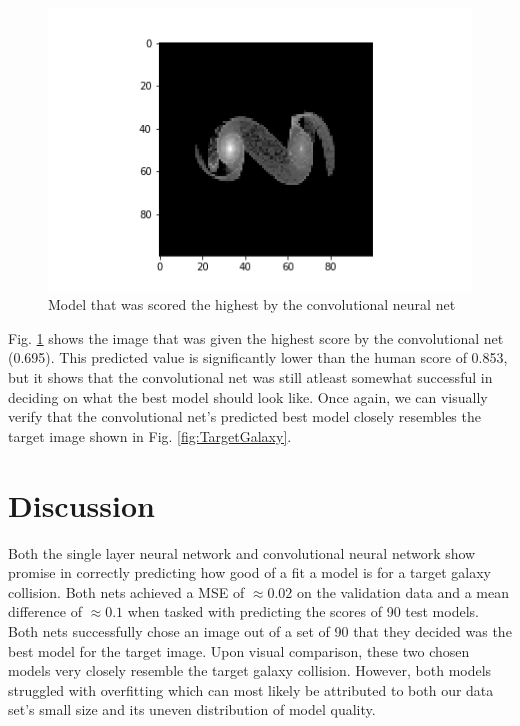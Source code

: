 \documentclass[conference]{IEEEtran}
\begin{document}
\begin{figure}[htbp]
\centerline{\includegraphics[width=0.75\linewidth]{./Images/ConvPredictedBest.png}}
\caption{Model that was scored the highest by the convolutional neural net}
\label{fig:ConvPredictedBest}
\end{figure}

Fig. \ref{fig:ConvPredictedBest} shows the image that was given the highest score by the convolutional net (0.695). This predicted value is significantly lower than the human score of 0.853, but it shows that the  convolutional net was still atleast somewhat successful in deciding on what the best model should look like. Once again, we can visually verify that the convolutional net's predicted best model closely resembles the target image shown in Fig. \ref{fig:TargetGalaxy}.

\section{Discussion}

Both the single layer neural network and convolutional neural network show promise in correctly predicting how good of a fit a model is for a target galaxy collision. Both nets achieved a MSE of $\approx 0.02$ on the validation data and a mean difference of $\approx 0.1$ when tasked with predicting the scores of 90 test models. Both nets successfully chose an image out of a set of 90 that they decided was the best model for the target image. Upon visual comparison, these two chosen models very closely resemble the target galaxy collision. However, both models struggled with overfitting which can most likely be attributed to both our data set's small size and its uneven distribution of model quality. 
\end{document}
